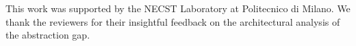 This work was supported by the NECST Laboratory at Politecnico di Milano. We thank the reviewers for their insightful feedback on the architectural analysis of the abstraction gap.